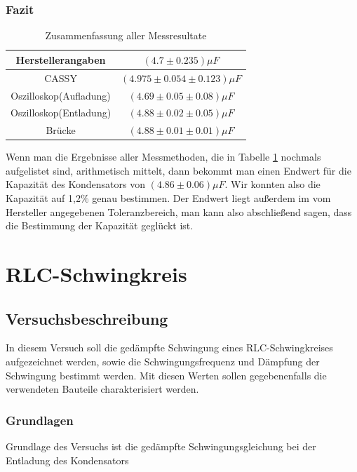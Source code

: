 \documentclass[12pt,a4paper]{article}
\begin{document}
\subsubsection{Fazit}
\begin{table}[H]
\begin{center}
\begin{tabular}{|c|c|}
\hline 
Herstellerangaben & $(4.7\pm0.235)\mu F$\\ 
\hline 
CASSY & $(4.975\pm 0.054\pm0.123)\mu F$\\
\hline 
Oszilloskop(Aufladung) & $(4.69\pm 0.05\pm 0.08)\mu F$ \\ 
\hline 
Oszilloskop(Entladung) & $(4.88\pm 0.02\pm 0.05)\mu F$ \\ 
\hline 
Brücke & $(4.88\pm0.01\pm0.01)\mu F$ \\ 
\hline 
\end{tabular} 
\end{center}
\caption{Zusammenfassung aller Messresultate}
\label{tab:kondzusammenfassung}
\end{table}
Wenn man die Ergebnisse aller Messmethoden, die in Tabelle \ref{tab:kondzusammenfassung} nochmals aufgelistet sind, arithmetisch mittelt, dann bekommt man einen Endwert für die Kapazität des Kondensators von $(4.86\pm 0.06) \mu F$. Wir konnten also die Kapazität auf 1,2\% genau bestimmen. Der Endwert liegt außerdem im vom Hersteller angegebenen Toleranzbereich, man kann also abschließend sagen, dass die Bestimmung der Kapazität geglückt ist.

\newpage
\section{RLC-Schwingkreis}
\subsection{Versuchsbeschreibung}

In diesem Versuch soll die gedämpfte Schwingung eines RLC-Schwingkreises aufgezeichnet werden, sowie die Schwingungsfrequenz und Dämpfung der Schwingung bestimmt werden.
Mit diesen Werten sollen gegebenenfalls die verwendeten Bauteile charakterisiert werden.

\subsubsection{Grundlagen}
Grundlage des Versuchs ist die gedämpfte Schwingungsgleichung bei der Entladung des Kondensators
\end{document}
